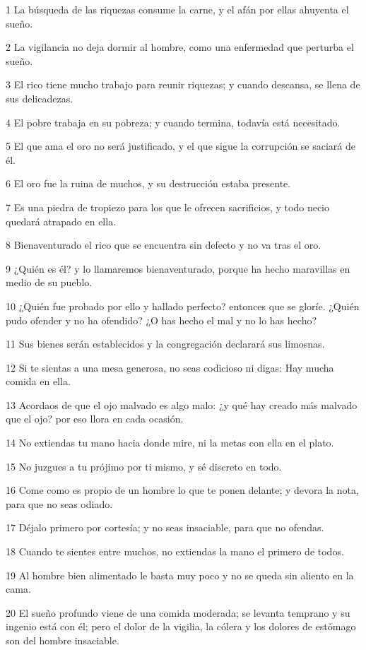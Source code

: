 \par 1 La búsqueda de las riquezas consume la carne, y el afán por ellas ahuyenta el sueño.
\par 2 La vigilancia no deja dormir al hombre, como una enfermedad que perturba el sueño.
\par 3 El rico tiene mucho trabajo para reunir riquezas; y cuando descansa, se llena de sus delicadezas.
\par 4 El pobre trabaja en su pobreza; y cuando termina, todavía está necesitado.
\par 5 El que ama el oro no será justificado, y el que sigue la corrupción se saciará de él.
\par 6 El oro fue la ruina de muchos, y su destrucción estaba presente.
\par 7 Es una piedra de tropiezo para los que le ofrecen sacrificios, y todo necio quedará atrapado en ella.
\par 8 Bienaventurado el rico que se encuentra sin defecto y no va tras el oro.
\par 9 ¿Quién es él? y lo llamaremos bienaventurado, porque ha hecho maravillas en medio de su pueblo.
\par 10 ¿Quién fue probado por ello y hallado perfecto? entonces que se gloríe. ¿Quién pudo ofender y no ha ofendido? ¿O has hecho el mal y no lo has hecho?
\par 11 Sus bienes serán establecidos y la congregación declarará sus limosnas.
\par 12 Si te sientas a una mesa generosa, no seas codicioso ni digas: Hay mucha comida en ella.
\par 13 Acordaos de que el ojo malvado es algo malo: ¿y qué hay creado más malvado que el ojo? por eso llora en cada ocasión.
\par 14 No extiendas tu mano hacia donde mire, ni la metas con ella en el plato.
\par 15 No juzgues a tu prójimo por ti mismo, y sé discreto en todo.
\par 16 Come como es propio de un hombre lo que te ponen delante; y devora la nota, para que no seas odiado.
\par 17 Déjalo primero por cortesía; y no seas insaciable, para que no ofendas.
\par 18 Cuando te sientes entre muchos, no extiendas la mano el primero de todos.
\par 19 Al hombre bien alimentado le basta muy poco y no se queda sin aliento en la cama.
\par 20 El sueño profundo viene de una comida moderada; se levanta temprano y su ingenio está con él; pero el dolor de la vigilia, la cólera y los dolores de estómago son del hombre insaciable.
